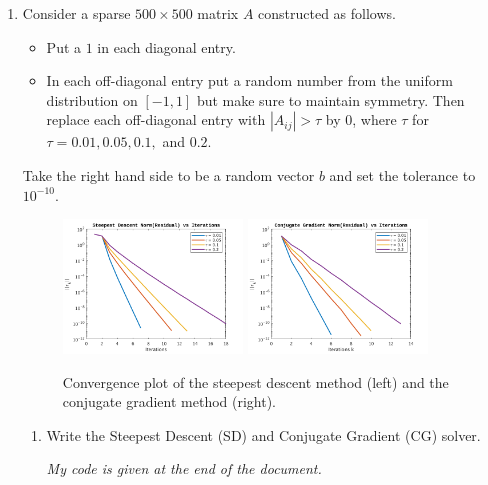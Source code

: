 \documentclass[a4paper,12pt]{article}
\newcommand{\abs}[1]{\left| #1 \right|}
\begin{document}
\begin{enumerate}[label = \arabic*)]
	\newpage
	\item Consider a sparse $ 500 \times 500 $ matrix $ A $ constructed as follows.
	\begin{itemize}[topsep = 0pt]
		\item Put a $ 1 $ in each diagonal entry.
		\item In each off-diagonal entry put a random number from the uniform distribution on $ [-1,1] $ but make sure to maintain symmetry. Then replace each off-diagonal entry with $ \abs{A_{ij}} > \tau $ by $ 0 $, where $ \tau $ for $ \tau = 0.01, 0.05, 0.1, $ and $ 0.2 $.
	
	\end{itemize}
		
	Take the right hand side to be a random vector $ b $ and set the tolerance to $ 10^{-10} $.
	
	\begin{figure}[h!]
		\centering
		\includegraphics[width = 0.45\textwidth]{images/steepestdescent.png}
		\includegraphics[width = 0.45\textwidth]{images/conjgrad.png}
		\captionsetup{width=0.8\textwidth}
		\caption{Convergence plot of the steepest descent method (left) and the conjugate gradient method (right).}
		\label{fig:conv}
	\end{figure}
	
	\begin{enumerate}[label = (\alph*)]
		\item Write the Steepest Descent (SD) and Conjugate Gradient (CG) solver.
		
		\begin{center}
			\emph{My code is given at the end of the document.}
		\end{center}
		

\end{enumerate}
\end{enumerate}
\end{document}
